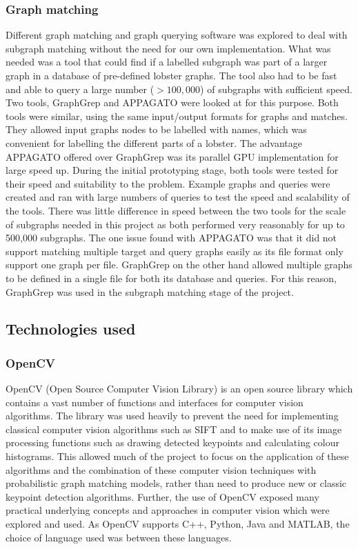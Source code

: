 \subsubsection{Graph matching}
Different graph matching and graph querying software was explored to deal with subgraph matching without the need for our own implementation. What was needed was a tool that could find if a labelled subgraph was part of a larger graph in a database of pre-defined lobster graphs. The tool also had to be fast and able to query a large number ($> 100,000$) of subgraphs with sufficient speed. Two tools, GraphGrep \cite{graphgrep} and APPAGATO \cite{appagato} were looked at for this purpose. 
\n
Both tools were similar, using the same input/output formats for graphs and matches. They allowed input graphs nodes to be labelled with names, which was convenient for labelling the different parts of a lobster. The advantage APPAGATO offered over GraphGrep was its parallel GPU implementation for large speed up. During the initial prototyping stage, both tools were tested for their speed and suitability to the problem. Example graphs and queries were created and ran with large numbers of queries to test the speed and scalability of the tools. There was little difference in speed between the two tools for the scale of subgraphs needed in this project as both performed very reasonably for up to 500,000 subgraphs. The one issue found with APPAGATO was that it did not support matching multiple target and query graphs easily as its file format only support one graph per file. GraphGrep on the other hand allowed multiple graphs to be defined in a single file for both its database and queries. For this reason, GraphGrep was used in the subgraph matching stage of the project.

\subsection{Technologies used}

\subsubsection{OpenCV}
OpenCV (Open Source Computer Vision Library) \cite{opencv} is an open source library which contains a vast number of functions and interfaces for computer vision algorithms. The library was used heavily to prevent the need for implementing classical computer vision algorithms such as SIFT \cite{sift} and to make use of its image processing functions such as drawing detected keypoints and calculating colour histograms. This allowed much of the project to focus on the application of these algorithms and the combination of these computer vision techniques with probabilistic graph matching models, rather than need to produce new or classic keypoint detection algorithms. Further, the use of OpenCV exposed many practical underlying concepts and approaches in computer vision which were explored and used.
\n
As OpenCV supports C++, Python, Java and MATLAB, the choice of language used was between these languages. 

